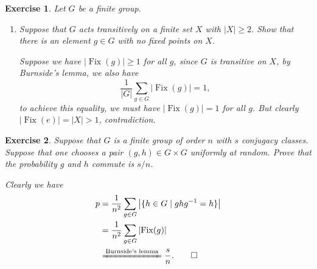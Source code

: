 \documentclass[11pt]{report}
\theoremstyle{mythm}
\let\oldendproof\endproof
\renewenvironment{proof}[1][\proofname]{%
  \oldproof[\normalfont \bfseries #1]%
}{\oldendproof}
\newtheorem{exercise}{Exercise}[chapter]
\renewcommand*{\proofname}{Proof}
\theoremstyle{myans}
\begin{document}
\begin{exercise}
  Let $G$ be a finite group.
  \begin{enumerate}
    \item Suppose that $G$ acts transitively on a finite set $X$ with $|X| \geq 2$. Show that there is
    an element $g \in G$ with no fixed points on $X$.
    \begin{proof}
      Suppose we have $\left| \operatorname{Fix}(g) \right| \geq 1$ for all $g$, since $G$ is transitive
      on $X$, by Burnside's lemma, we also have
      \[ \frac 1{|G|} \sum_{g\in G} \left| \operatorname{Fix}(g) \right| = 1, \]
      to achieve this equality, we must have $\left| \operatorname{Fix}(g) \right| = 1$ for all $g$.
      But clearly $\left| \operatorname{Fix}(e) \right| = |X| > 1$, contradiction.
    \end{proof}
  \end{enumerate}
\end{exercise}

\setcounter{exercise}{8}
\begin{exercise}
  Suppose that $G$ is a finite group of order $n$ with $s$ conjugacy classes.
  Suppose that one chooses a pair $(g, h) \in G \times G$ uniformly at random. Prove that the
  probability $g$ and $h$ commute is $s/n$.
  \begin{proof}
    Clearly we have
    \begin{align*}
      p &= \frac 1{n^2} \sum_{g\in G} \left|\{h\in G \mid ghg^{-1} = h\}\right|\\
      &= \frac 1{n^2} \sum_{g\in G} \left| \operatorname{Fix}(g) \right|\\
      &\xlongequal{\text{Burnside's lemma}} \frac s n. \qedhere
    \end{align*}
  \end{proof}
\end{exercise}
\end{document}
